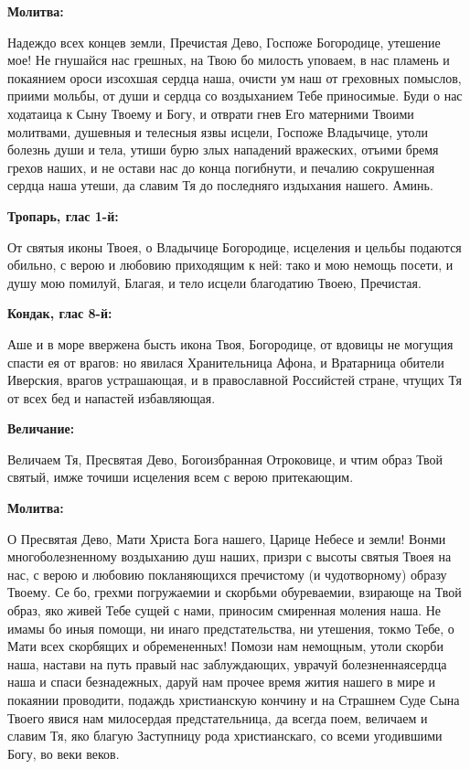 \medskip


\bfseries Молитва:\normalfont{}\nopagebreak


Надеждо всех концев земли, Пречистая Дево, Госпоже Богородице, утешение мое! Не гнушайся нас грешных, на Твою бо милость уповаем, в нас пламень и покаянием ороси изсохшая сердца наша, очисти ум наш от греховных помыслов, приими мольбы, от души и сердца со воздыханием Тебе приносимые. Буди о нас ходатаица к Сыну Твоему и Богу, и отврати гнев Его матерними Твоими молитвами, душевныя и телесныя язвы исцели, Госпоже Владычице, утоли болезнь души и тела, утиши бурю злых нападений вражеских, отъими бремя грехов наших, и не остави нас до конца погибнути, и печалию сокрушенная сердца наша утеши, да славим Тя до последняго издыхания нашего. Аминь.


\bigskip\bigskip\mychapterending

 

\bfseries Тропарь, глас 1-й:\normalfont{}\nopagebreak


От святыя иконы Твоея, о Владычице Богородице, исцеления и цельбы подаются обильно, с верою и любовию приходящим к ней: тако и мою немощь посети, и душу мою помилуй, Благая, и тело исцели благодатию Твоею, Пречистая.


\medskip


\bfseries Кондак, глас 8-й:\normalfont{}\nopagebreak


Аше и в море ввержена бысть икона Твоя, Богородице, от вдовицы не могущия спасти ея от врагов: но явилася Хранительница Афона, и Вратарница обители Иверския, врагов устрашающая, и в православной Российстей стране, чтущих Тя от всех бед и напастей избавляющая.


\medskip


\bfseries Величание:\normalfont{}\nopagebreak


Величаем Тя, Пресвятая Дево, Богоизбранная Отроковице, и чтим образ Твой святый, имже точиши исцеления всем с верою притекающим.


\medskip


\bfseries Молитва:\normalfont{}\nopagebreak


О Пресвятая Дево, Мати Христа Бога нашего, Царице Небесе и земли! Вонми многоболезненному воздыханию душ наших, призри с высоты святыя Твоея на нас, с верою и любовию покланяющихся пречистому (и чудотворному) образу Твоему. Се бо, грехми погружаемии и скорбьми обуреваемии, взирающе на Твой образ, яко живей Тебе сущей с нами, приносим смиренная моления наша. Не имамы бо иныя помощи, ни инаго предстательства, ни утешения, токмо Тебе, о Мати всех скорбящих и обремененных! Помози нам немощным, утоли скорби наша, настави на путь правый нас заблуждающих, уврачуй болезненнаясердца наша и спаси безнадежных, даруй нам прочее время жития нашего в мире и покаянии проводити, подаждь христианскую кончину и на Страшнем Суде Сына Твоего явися нам милосердая предстательница, да всегда поем, величаем и славим Тя, яко благую Заступницу рода христианскаго, со всеми угодившими Богу, во веки веков. 


